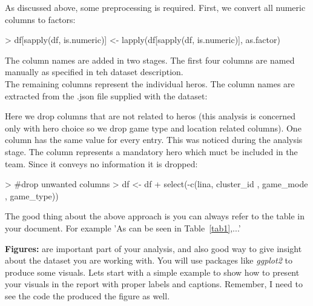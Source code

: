 \documentclass[10pt]{article}
\begin{document}
As discussed above, some preprocessing is required. First, we convert all numeric columns to factors:
\begin{Schunk}
\begin{Sinput}
> df[sapply(df, is.numeric)] <- lapply(df[sapply(df, is.numeric)], as.factor)
\end{Sinput}
\end{Schunk}

The column names are added in two stages. The first four columns are named manually as specified in teh dataset description.\\
The remaining columns represent the individual heros. The column names are extracted from the .json file supplied with the dataset:
\begin{Schunk}
\end{Schunk}


Here we drop columns that are not related to heros (this analysis is concerned only with hero choice so we drop game type and location related columns). 
One column has the same value for every entry. This was noticed during the analysis stage. The column represents a mandatory hero which muct be included in the team. Since it conveys no information it is dropped:
\begin{Schunk}
\begin{Sinput}
> #drop unwanted columns
> df <- df%
+   select(-c(lina, cluster_id , game_mode , game_type))
\end{Sinput}
\end{Schunk}




The good thing about the above approach is you can always refer to the table in your document. For example 'As can be seen in Table~\ref{tab1},...'

\textbf{Figures:} are important part of your analysis, and also good way to give insight about the dataset you are working with. You will use packages like \textit{ggplot2} to produce some visuals. Lets start with a simple example to show how to present your visuals in the report with proper labels and captions. Remember, I need to see the code the produced the figure as well. \\
\end{document}
